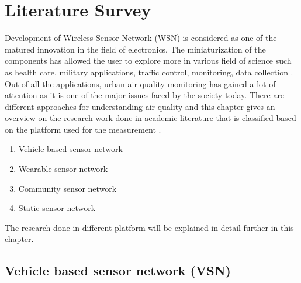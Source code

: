 \chapter{Literature Survey}

Development of Wireless Sensor Network (WSN) is considered as one of the matured innovation in the field of electronics. The miniaturization of the components has allowed the user to explore more in various field of science such as health care, military applications, traffic control, monitoring, data collection \cite{Khedo2017} \cite{Liu2017}. Out of all the applications, urban air quality monitoring has gained a lot of attention as it is one of the major issues faced by the society today. There are different approaches for understanding air quality and this chapter gives an overview on the research work done in academic literature that is classified based on the platform used for the measurement\cite{Yi2015} \cite{Pavani2017}.
 
\begin{enumerate}

    \item Vehicle based sensor network
    \item Wearable sensor network
    \item Community sensor network
    \item Static sensor network

 \end{enumerate} 

 The research done in different platform will be explained in detail further in this chapter.

\section{Vehicle based sensor network (VSN)}

